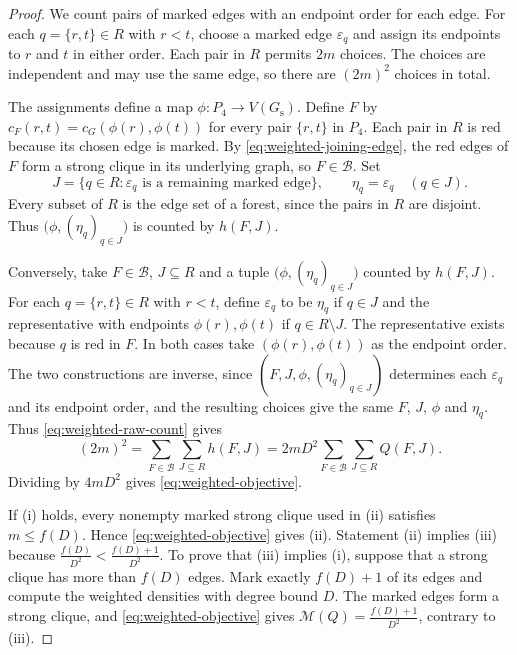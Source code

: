 \documentclass[preprint,11pt,numbers]{elsarticle-arxiv}
\numberwithin{equation}{section}
\theoremstyle{definition}
\begin{document}
\begin{proof}
We count pairs of marked edges with an endpoint order
for each edge. For each $q=\{r,t\}\in R$ with $r<t$, choose a
marked edge $\varepsilon_q$ and assign its endpoints to $r$ and
$t$ in either order. Each pair in $R$ permits $2m$ choices.
The choices are independent and may use the same edge, so there
are $(2m)^2$ choices in total.

The assignments define a map $\phi\colon P_4\to V(G_{\mathrm s})$.
Define $F$ by $c_F(r,t)=c_G(\phi(r),\phi(t))$ for every pair
$\{r,t\}$ in $P_4$. Each pair in $R$ is red because its chosen
edge is marked. By \eqref{eq:weighted-joining-edge}, the red edges
of $F$ form a strong clique in its underlying graph, so
$F\in\mathcal B$. Set
\[
 J=\{q\in R:\varepsilon_q\text{ is a remaining marked edge}\},
 \qquad \eta_q=\varepsilon_q\quad(q\in J).
\]
Every subset of $R$ is the edge set of a forest, since the pairs in
$R$ are disjoint.
Thus $\bigl(\phi,(\eta_q)_{q\in J}\bigr)$ is counted by $h(F,J)$.

Conversely, take $F\in\mathcal B$, $J\subseteq R$ and a tuple
$\bigl(\phi,(\eta_q)_{q\in J}\bigr)$ counted by $h(F,J)$. For
each $q=\{r,t\}\in R$ with $r<t$, define $\varepsilon_q$ to be
$\eta_q$ if $q\in J$ and the representative with endpoints
$\phi(r),\phi(t)$ if $q\in R\setminus J$. The representative
exists because $q$ is red in $F$. In both cases take
$(\phi(r),\phi(t))$ as the endpoint order. The two constructions
are inverse, since $(F,J,\phi,(\eta_q)_{q\in J})$ determines
each $\varepsilon_q$ and its endpoint order, and the resulting
choices give the same $F$, $J$, $\phi$ and $\eta_q$. Thus
\eqref{eq:weighted-raw-count} gives
\[
 (2m)^2=\sum_{F\in\mathcal B}\sum_{J\subseteq R}h(F,J)
       =2mD^2\sum_{F\in\mathcal B}\sum_{J\subseteq R}Q(F,J).
\]
Dividing by $4mD^2$ gives \eqref{eq:weighted-objective}.

If \textup{(i)} holds, every nonempty marked strong clique used
in \textup{(ii)} satisfies $m\leq f(D)$. Hence
\eqref{eq:weighted-objective} gives \textup{(ii)}. Statement
\textup{(ii)} implies \textup{(iii)} because
$\frac{f(D)}{D^2}<\frac{f(D)+1}{D^2}$.
To prove that \textup{(iii)} implies \textup{(i)}, suppose that a
strong clique has more than $f(D)$ edges. Mark exactly $f(D)+1$ of
its edges and compute the weighted densities with degree bound $D$.
The marked edges form a strong clique, and
\eqref{eq:weighted-objective} gives
$\mathcal M(Q)=\frac{f(D)+1}{D^2}$, contrary to \textup{(iii)}.
\end{proof}
\end{document}
